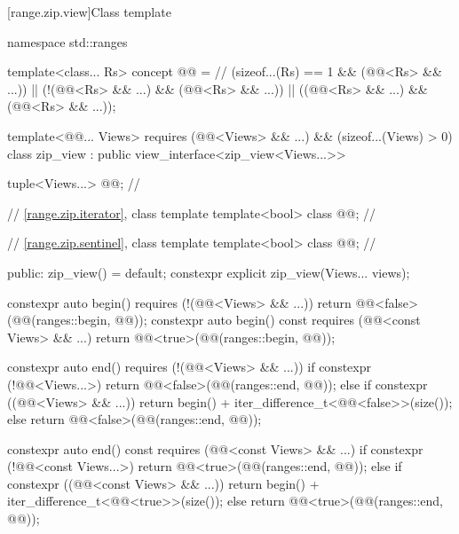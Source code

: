 [range.zip.view]{Class template }

%
%
%
\begin{codeblock}
namespace std::ranges {
  template<class... Rs>
  concept @@ =                             // \expos
    (sizeof...(Rs) == 1 && (@@<Rs> && ...)) ||
    (!(@@<Rs> && ...) && (@@<Rs> && ...)) ||
    ((@@<Rs> && ...) && (@@<Rs> && ...));

  template<@@... Views>
    requires (@@<Views> && ...) && (sizeof...(Views) > 0)
  class zip_view : public view_interface<zip_view<Views...>> {
    tuple<Views...> @@;             // \expos

    // \ref{range.zip.iterator}, class template 
    template<bool> class @@;      // \expos

    // \ref{range.zip.sentinel}, class template 
    template<bool> class @@;      // \expos

  public:
    zip_view() = default;
    constexpr explicit zip_view(Views... views);

    constexpr auto begin() requires (!(@@<Views> && ...)) {
      return @@<false>(@@(ranges::begin, @@));
    }
    constexpr auto begin() const requires (@@<const Views> && ...) {
      return @@<true>(@@(ranges::begin, @@));
    }

    constexpr auto end() requires (!(@@<Views> && ...)) {
      if constexpr (!@@<Views...>) {
        return @@<false>(@@(ranges::end, @@));
      } else if constexpr ((@@<Views> && ...)) {
        return begin() + iter_difference_t<@@<false>>(size());
      } else {
        return @@<false>(@@(ranges::end, @@));
      }
    }

    constexpr auto end() const requires (@@<const Views> && ...) {
      if constexpr (!@@<const Views...>) {
        return @@<true>(@@(ranges::end, @@));
      } else if constexpr ((@@<const Views> && ...)) {
        return begin() + iter_difference_t<@@<true>>(size());
      } else {
        return @@<true>(@@(ranges::end, @@));
      }
    }

}}
\end{codeblock}
